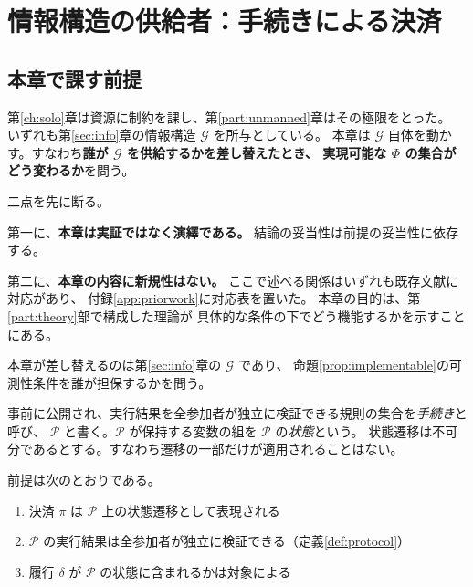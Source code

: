 \chapter{情報構造の供給者：手続きによる決済}
\label{ch:protocol}

\section{本章で課す前提}

第\ref{ch:solo}章は資源に制約を課し、第\ref{part:unmanned}章はその極限をとった。
いずれも第\ref{sec:info}章の情報構造 $\mathcal{G}$ を所与としている。
本章は $\mathcal{G}$ 自体を動かす。すなわち\textbf{誰が $\mathcal{G}$ を供給するかを差し替えたとき、
実現可能な $\Phi$ の集合がどう変わるか}を問う。

二点を先に断る。

第一に、\textbf{本章は実証ではなく演繹である。} 結論の妥当性は前提の妥当性に依存する。

第二に、\textbf{本章の内容に新規性はない。} ここで述べる関係はいずれも既存文献に対応があり、
付録\ref{app:priorwork}に対応表を置いた。
本章の目的は、第\ref{part:theory}部で構成した理論が
具体的な条件の下でどう機能するかを示すことにある。

本章が差し替えるのは第\ref{sec:info}章の $\mathcal{G}$ であり、
命題\ref{prop:implementable}の可測性条件を誰が担保するかを問う。

\begin{definition}[手続き]
\label{def:protocol}
事前に公開され、実行結果を全参加者が独立に検証できる規則の集合を\emph{手続き}と呼び、
$\mathcal{P}$ と書く。$\mathcal{P}$ が保持する変数の組を $\mathcal{P}$ の\emph{状態}という。
状態遷移は不可分であるとする。すなわち遷移の一部だけが適用されることはない。
\end{definition}

前提は次のとおりである。

\begin{enumerate}[label=(\arabic*)]
\item 決済 $\pi$ は $\mathcal{P}$ 上の状態遷移として表現される
\item $\mathcal{P}$ の実行結果は全参加者が独立に検証できる（定義\ref{def:protocol}）
\item 履行 $\delta$ が $\mathcal{P}$ の状態に含まれるかは対象による
\end{enumerate}

